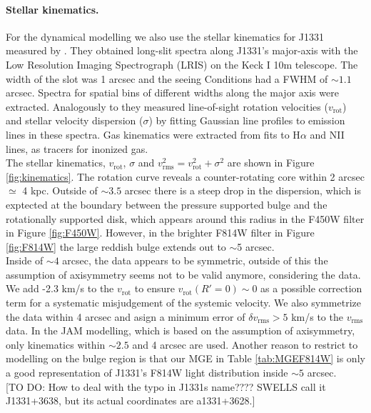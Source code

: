 \paragraph{Stellar kinematics.} For the dynamical modelling we also use the stellar kinematics for J1331 measured by \citet{SWELLSV}. They obtained long-slit spectra along J1331's major-axis with the Low Resolution Imaging Spectrograph (LRIS) on the Keck I 10m telescope. The width of the slot was 1 arcsec and the seeing Conditions had a FWHM of $\sim 1.1$ arcsec. Spectra for spatial bins of different widths along the major axis were extracted. Analogously to \citet{SWELLSII} they measured line-of-sight rotation velocities ($v_\text{rot}$) and stellar velocity dispersion ($\sigma$) by fitting Gaussian line profiles to emission lines in these spectra. Gas kinematics were extracted from fits to H$\alpha$ and NII lines, as tracers for inonized gas.
\\The stellar kinematics, $v_\text{rot}$, $\sigma$ and $v_\text{rms}^2=v_\text{rot}^2 + \sigma^2$ are shown in Figure \ref{fig:kinematics}. The rotation curve reveals a counter-rotating core within 2 arcsec $\simeq$ 4 kpc. Outside of $\sim 3.5$ arcsec there is a steep drop in the dispersion, which is exptected at the boundary between the pressure supported bulge and the rotationally supported disk, which appears around this radius in the F450W filter in Figure \ref{fig:F450W}. However, in the brighter F814W filter in Figure \ref{fig:F814W}  the large reddish bulge extends out to $\sim$5 arcsec. 
\\Inside of $\sim 4$ arcsec, the data appears to be symmetric, outside of this the assumption of axisymmetry seems not to be valid anymore, considering the data. We add -2.3 km/s to the $v_\text{rot}$ to ensure $v_\text{rot}(R'=0) \sim 0$ as a possible correction term for a systematic misjudgement of the systemic velocity. We also symmetrize the data within 4 arcsec and asign a minimum error of $\delta v_\text{rms} > 5$ km/s to the $v_\text{rms}$ data. In the JAM modelling, which is based on the assumption of axisymmetry, only kinematics within $\sim 2.5$ and 4 arcsec are used. Another reason to restrict to modelling on the bulge region is that our MGE in Table \ref{tab:MGEF814W} is only a good representation of J1331's F814W light distribution inside $\sim 5$ arcsec.\\

[TO DO: How to deal with the typo in J1331s name???? SWELLS call it J1331+3638, but its actual coordinates are a1331+3628.]